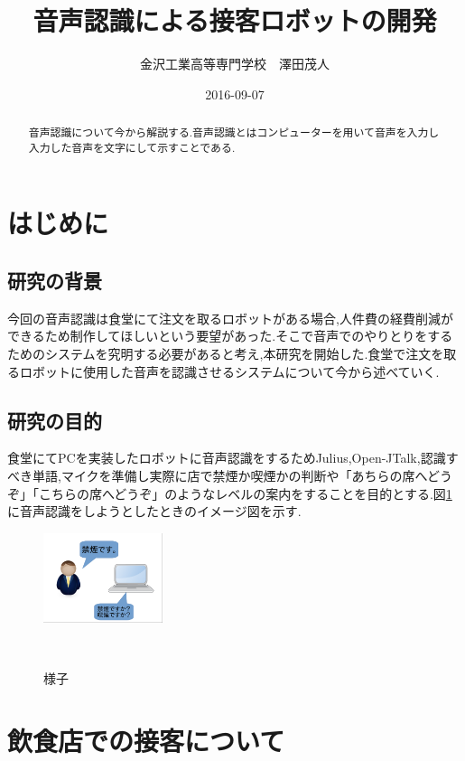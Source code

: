 \documentclass[11pt]{si2016}
\title{音声認識による接客ロボットの開発}
\author{金沢工業高等専門学校　澤田茂人}
\date{2016-09-07}
\begin{document}
\maketitle
\begin{abstract}
音声認識について今から解説する.音声認識とはコンピューターを用いて音声を入力し入力した音声を文字にして示すことである.
\end{abstract}


\tableofcontents
\section{はじめに}
\subsection{研究の背景}
今回の音声認識は食堂にて注文を取るロボットがある場合,人件費の経費削減ができるため制作してほしいという要望があった.そこで音声でのやりとりをするためのシステムを究明する必要があると考え,本研究を開始した.食堂で注文を取るロボットに使用した音声を認識させるシステムについて今から述べていく.


\subsection{研究の目的}
食堂にてPCを実装したロボットに音声認識をするためJulius,Open-JTalk,認識すべき単語,マイクを準備し実際に店で禁煙か喫煙かの判断や「あちらの席へどうぞ」「こちらの席へどうぞ」のようなレベルの案内をすることを目的とする.図\ref{fig:yousu}に音声認識をしようとしたときのイメージ図を示す.


\begin{figure}[h]
 \begin{center}
  \includegraphics[width=35mm]{img/sukusho.png}
 　\caption{様子}
 　\label{fig:yousu}
 \end{center}
\end{figure}


\section{飲食店での接客について}
\end{document}
